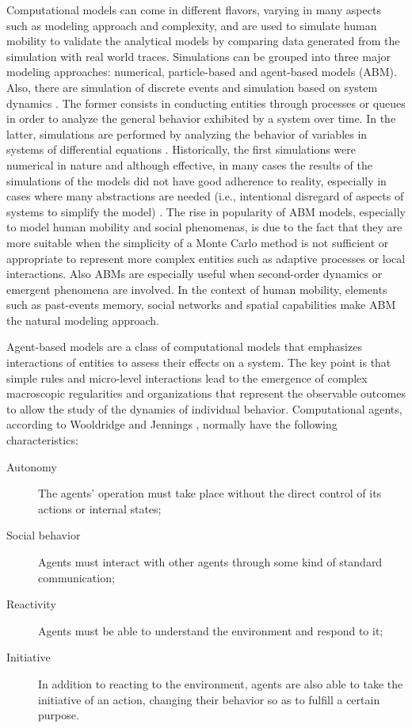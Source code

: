 Computational models can come in different flavors, varying in many aspects such as modeling approach and complexity, and are used to simulate human mobility to validate the analytical models by comparing data generated from the simulation with real world traces. Simulations can be grouped into three major modeling approaches: numerical, particle-based and agent-based models (ABM). Also, there are simulation of discrete events and  simulation based on system dynamics \cite{zeigler_2000_theory}. The former consists in conducting entities through processes or queues in order to analyze the general behavior exhibited by a system over time. In the latter, simulations are performed by analyzing the behavior of variables in systems of differential equations \cite{epstein_1997_nonlinear}. Historically, the first simulations were numerical in nature and although effective, in many cases the results of the simulations of the models did not have good adherence to reality, especially in cases where many abstractions are needed (i.e., intentional disregard of aspects of systems to simplify the model) \cite{lane_2000_you}.
The rise in popularity of ABM models, especially to model human mobility and social phenomenas, is due to the fact that they are more suitable when the simplicity of a Monte Carlo method is not sufficient or appropriate to represent more complex entities such as adaptive processes or local interactions. Also ABMs are especially useful when second-order dynamics or emergent phenomena are involved. In the context of human mobility, elements such as past-events memory, social networks and spatial capabilities make ABM the natural modeling approach.

Agent-based models are a class of computational models that emphasizes interactions of entities to assess their effects on a system. The key point is that simple rules and micro-level interactions lead to the emergence of complex macroscopic regularities and organizations that represent the observable outcomes to allow the study of the dynamics of individual behavior. 
Computational agents, according to Wooldridge and Jennings \cite{wooldridge_1995_intelligent}, normally have the following characteristics:
   \begin{description}
   \item [Autonomy] The agents' operation must take place without the direct control of its actions or internal states;
   \item [Social behavior] Agents must interact with other agents through some kind of standard communication;
   \item [Reactivity] Agents must be able to understand the environment and respond to it;
   \item [Initiative] In addition to reacting to the environment, agents are also able to take the initiative of an action, changing their behavior so as to fulfill a certain purpose.
 \end{description}
 
